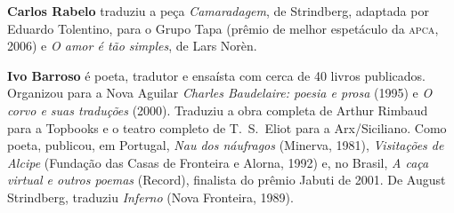 \textbf{Carlos Rabelo} traduziu a peça \textit{Camaradagem}, de Strindberg, adaptada por Eduardo Tolentino, 
para o Grupo Tapa (prêmio de melhor espetáculo da \textsc{apca}, 2006) e \textit{O amor é tão simples}, de Lars Norèn.

\textbf{Ivo Barroso} é poeta, tradutor e ensaísta com cerca de 40 livros publicados. 
Organizou para a Nova Aguilar \textit{Charles Baudelaire: poesia e prosa} (1995) e \textit{O corvo e suas traduções} (2000). 
Traduziu a obra completa de Arthur Rimbaud para a Topbooks e o teatro completo de T.~S.~Eliot para a Arx/Siciliano. 
Como poeta, publicou, em Portugal, \textit{Nau dos náufragos} (Minerva, 1981), \textit{Visitações de Alcipe} (Fundação das Casas de 
Fronteira e Alorna, 1992) e, no Brasil, \textit{A caça virtual e outros  poemas} (Record), finalista do prêmio Jabuti de 2001. 
De August Strindberg, traduziu \textit{Inferno} (Nova Fronteira, 1989).



